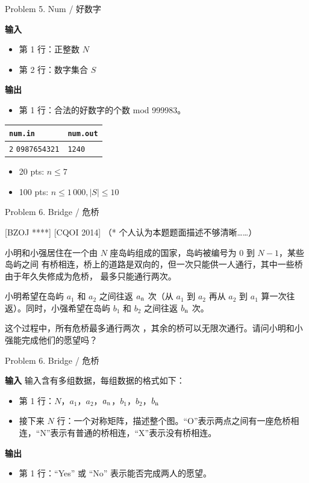 \documentclass[UTF8]{beamer}
\begin{document}
\begin{frame}{Problem 5. Num / 好数字}

\textbf{输入}
\begin{itemize}
    \item 第 1 行：正整数 $N$
    \item 第 2 行：数字集合 $S$
\end{itemize}
\textbf{输出}
\begin{itemize}
    \item 第 1 行：合法的好数字的个数 mod 999983。
\end{itemize}

\begin{tabularx}{\textwidth}{|X|X|}
\hline
\texttt{\textbf{num.in}} & \texttt{\textbf{num.out}} \\ \hline
\texttt{2}\newline
\texttt{0987654321}
&
\texttt{1240}
\\ \hline
\end{tabularx}
\newline
\begin{itemize}
    \item 20 pts: $n \leq 7$
    \item 100 pts: $n \leq 1\,000, |S| \leq 10$
\end{itemize}

\end{frame}


\begin{frame}{Problem 6. Bridge / 危桥}

[BZOJ ****] [CQOI 2014]  （* 个人认为本题题面描述不够清晰……）

小明和小强居住在一个由 $N$ 座岛屿组成的国家，岛屿被编号为 0 到 $N - 1$，某些岛屿之间
有桥相连，桥上的道路是双向的，但一次只能供一人通行，其中一些桥由于年久失修成为危桥，
最多只能通行两次。

小明希望在岛屿 $a_1$ 和 $a_2$ 之间往返 $a_{\rm n}$ 次（从 $a_1$ 到 $a_2$ 再从 $a_2$ 到 $a_1$
算一次往返）。同时，小强希望在岛屿 $b_1$ 和 $b_2$ 之间往返 $b_{\rm n}$ 次。

这个过程中，所有危桥最多通行两次 ，其余的桥可以无限次通行。请问小明和小强能完成他们的愿望吗？

\end{frame}

\begin{frame}{Problem 6. Bridge / 危桥}

\textbf{输入}
输入含有多组数据，每组数据的格式如下：
\begin{itemize}
    \item 第 1 行：$N$，$a_1$，$a_2$，$a_{\rm n}$，$b_1$，$b_2$，$b_{\rm n}$
    \item 接下来 $N$ 行：一个对称矩阵，描述整个图。“O”表示两点之间有一座危桥相连，“N”表示有普通的桥相连，“X”表示没有桥相连。
\end{itemize}
\textbf{输出}
\begin{itemize}
    \item 第 1 行：“Yes” 或 “No” 表示能否完成两人的愿望。
\end{itemize}

\end{frame}
\end{document}
